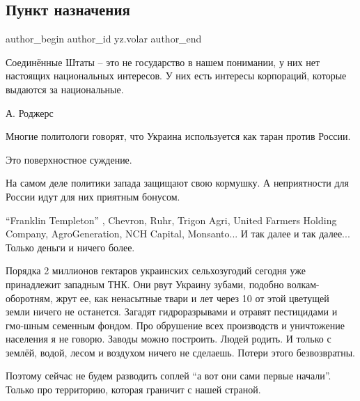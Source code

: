  
 
 
 
 
 
\subsection{Пункт назначения}
\label{sec:20_01_2022.yz.volar.1.punkt_naznachenia}
 
\ifcmt
 author_begin
   author_id yz.volar
 author_end
\fi

\begin{zznagolos}
Соединённые Штаты – это не государство в нашем понимании, у них нет настоящих
национальных интересов. У них есть интересы корпораций, которые выдаются за
национальные.

А. Роджерс	
\end{zznagolos}

Многие политологи говорят, что Украина используется как таран против России.

Это поверхностное суждение.

На самом деле политики запада защищают свою кормушку. А неприятности для России
идут для них приятным бонусом.

\enquote{Franklin Templeton} , Chevron, Ruhr, Trigon Agri, United Farmers
Holding Company, AgroGeneration, NCH Capital, Monsanto... И так далее и так
далее...  Только деньги и ничего более.

Порядка 2 миллионов гектаров украинских сельхозугодий сегодня уже принадлежит
западным ТНК. Они рвут Украину зубами, подобно волкам-оборотням, жрут ее, как
ненасытные твари и лет через 10 от этой цветущей земли ничего не останется.
Загадят гидроразрывами и отравят пестицидами и гмо-шным семенным фондом. Про
обрушение всех производств и уничтожение населения я не говорю. Заводы можно
построить. Людей родить. И только с землёй, водой, лесом и воздухом ничего не
сделаешь. Потери этого безвозвратны.

Поэтому сейчас не будем разводить соплей \enquote{а вот они сами первые начали}.
Только про территорию, которая граничит с нашей страной.

